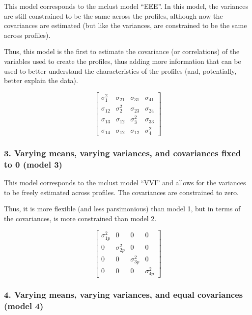 \documentclass[]{msu-thesis}
\theoremstyle{definition}
\theoremstyle{definition}
\theoremstyle{definition}
\theoremstyle{remark}
\begin{document}
This model corresponds to the mclust model ``EEE''. In this model, the
variances are still constrained to be the same across the profiles,
although now the covariances are estimated (but like the variances, are
constrained to be the same across profiles).

Thus, this model is the first to estimate the covariance (or
correlations) of the variables used to create the profiles, thus adding
more information that can be used to better understand the
characteristics of the profiles (and, potentially, better explain the
data).

\[
\left[ \begin{matrix} { \sigma  }_{ 1 }^{ 2 } & { \sigma  }_{ 21 } & { \sigma  }_{ 31 } & { \sigma  }_{ 41 } \\ { \sigma  }_{ 12 } & { \sigma  }_{ 2 }^{ 2 } & { \sigma  }_{ 23 } & { \sigma  }_{ 24 } \\ { \sigma  }_{ 13 } & { \sigma  }_{ 12 } & { \sigma  }_{ 3 }^{ 2 } & { \sigma  }_{ 33 } \\ { \sigma  }_{ 14 } & { \sigma  }_{ 12 } & { \sigma  }_{ 12 } & { \sigma  }_{ 4 }^{ 2 } \end{matrix} \right] 
\]

\subsubsection{3. Varying means, varying variances, and covariances
fixed to 0 (model
3)}\label{varying-means-varying-variances-and-covariances-fixed-to-0-model-3}

This model corresponds to the mclust model ``VVI'' and allows for the
variances to be freely estimated across profiles. The covariances are
constrained to zero.

Thus, it is more flexible (and less parsimonious) than model 1, but in
terms of the covariances, is more constrained than model 2.

\[ 
\left[ \begin{matrix} { \sigma  }_{ 1p }^{ 2 } & 0 & 0 & 0 \\ 0 & { \sigma  }_{ 2p }^{ 2 } & 0 & 0 \\ 0 & 0 & { \sigma  }_{ 3p }^{ 2 } & 0 \\ 0 & 0 & 0 & { \sigma  }_{ 4p }^{ 2 } \end{matrix} \right] 
\]

\subsubsection{4. Varying means, varying variances, and equal
covariances (model
4)}\label{varying-means-varying-variances-and-equal-covariances-model-4}
\end{document}
